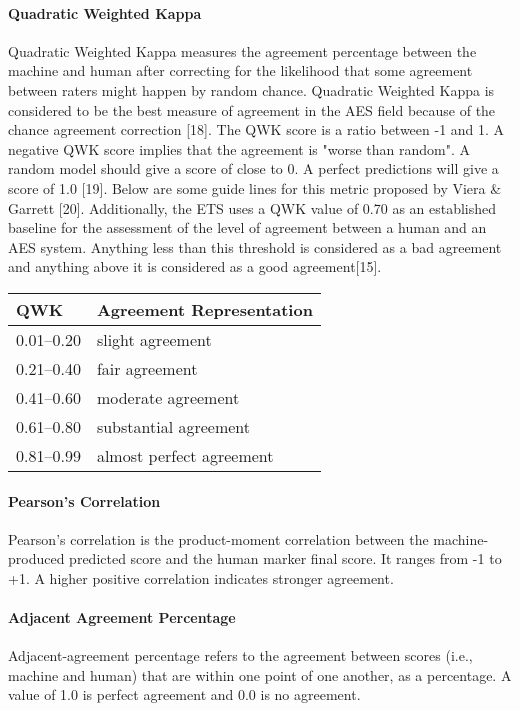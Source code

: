 \paragraph{Quadratic Weighted Kappa} Quadratic Weighted Kappa measures the agreement percentage between the machine and human after correcting for the likelihood that some agreement between raters might happen by random chance. Quadratic Weighted Kappa is considered to be the best  measure of agreement in the AES field because of the chance agreement correction [18]. 
The QWK score is a ratio between -1 and 1. A negative QWK score implies that the agreement is "worse than random". A random model should give a score of close to 0. A perfect predictions will give a score of 1.0 [19]. Below are some guide lines for this metric proposed by Viera & Garrett [20].  Additionally, the ETS uses a QWK value of 0.70 as an established baseline for the assessment of the level of agreement between a human and an AES system. Anything less than this threshold is considered as a bad agreement and anything above it is considered as a good agreement[15].

\begin{table}[h]
\centering
\begin{tabular}{@{}ll@{}}
\toprule
QWK       & Agreement Representation \\ \midrule
0.01–0.20 & slight agreement         \\
0.21–0.40 & fair agreement           \\
0.41–0.60 & moderate agreement       \\
0.61–0.80 & substantial agreement    \\
0.81–0.99 & almost perfect agreement \\ \bottomrule
\end{tabular}
\end{table}

\paragraph{Pearson’s Correlation} Pearson’s correlation is the product-moment correlation between the machine-produced predicted score and the human marker final score. It ranges from -1 to +1. A higher positive correlation indicates stronger agreement. 

\paragraph{Adjacent Agreement Percentage} Adjacent-agreement percentage refers to the agreement between scores (i.e., machine and human) that are within one point of one another, as a percentage. A value of 1.0 is perfect agreement and 0.0 is no agreement. 

